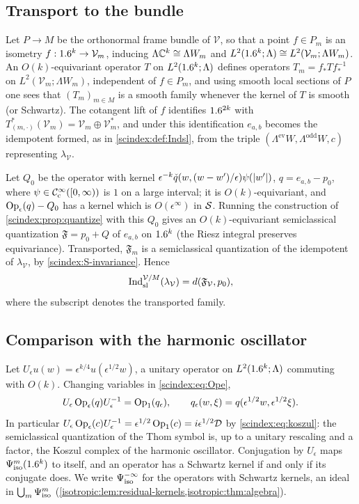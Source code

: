 \subsection{Transport to the bundle}
Let $P\to M$ be the orthonormal frame bundle of $\mathcal V$, so that a point
$f\in P_m$ is an isometry $f:1.6^k\to\mathcal V_m$, inducing $\Lambda\mathbb{C}^k\cong
\Lambda W_m$ and $L^2(1.6^k;\Lambda)\cong L^2(\mathcal V_m;\Lambda W_m)$. An
$O(k)$-equivariant operator $T$ on $L^2(1.6^k;\Lambda)$ defines operators
$T_m=f_*Tf_*^{-1}$ on $L^2(\mathcal V_m;\Lambda W_m)$, independent of $f\in P_m$, and
using smooth local sections of $P$ one sees that $(T_m)_{m\in M}$ is a smooth
family whenever the kernel of $T$ is smooth (or Schwartz). The cotangent lift of $f$
identifies $1.6^{2k}$ with $T^*_{(m,\cdot)}(\mathcal V_m)=\mathcal V_m\oplus
\mathcal V_m^*$, and under this identification $e_{a,b}$ becomes the idempotent
formed, as in \cref{scindex:def:Indsl}, from the triple $(\Lambda^{\mathrm{ev}}W,
\Lambda^{\mathrm{odd}}W,c)$ representing $\lambda_{\mathcal V}$.

Let $Q_0$ be the operator with kernel $\epsilon^{-k}\check q(w,(w-w')/\epsilon)
\psi(\lvert w'\rvert)$, $q=e_{a,b}-p_0$, where $\psi\in\mathcal{C}^\infty_{\mathrm{c}}([0,\infty))$ is $1$ on a
large interval; it is $O(k)$-equivariant, and $\operatorname{Op}_\epsilon(q)-Q_0$ has a kernel which is
$O(\epsilon^\infty)$ in $\mathcal{S}$. Running the construction of
\cref{scindex:prop:quantize} with this $Q_0$ gives an $O(k)$-equivariant
semiclassical quantization $\mathfrak F=p_0+Q$ of $e_{a,b}$ on $1.6^k$ (the Riesz
integral preserves equivariance). Transported, $\mathfrak F_m$ is a semiclassical
quantization of the idempotent of $\lambda_{\mathcal V}$, by
\ref{scindex:S-invariance}. Hence
\begin{equation}\label{scindex:eq:thom-F}
  \operatorname{Ind}^{\mathcal V/M}_{\mathrm{sl}}(\lambda_{\mathcal V})=d(\mathfrak F_{\mathcal V},p_0),
\end{equation}
where the subscript denotes the transported family.

\subsection{Comparison with the harmonic oscillator}
Let $U_\epsilon u(w)=\epsilon^{k/4}u(\epsilon^{1/2}w)$, a unitary operator on
$L^2(1.6^k;\Lambda)$ commuting with $O(k)$. Changing variables in
\eqref{scindex:eq:Ope},
\begin{equation}\label{scindex:eq:dilation}
  U_\epsilon\operatorname{Op}_\epsilon(q)U_\epsilon^{-1}=\operatorname{Op}_1(q_\epsilon),\qquad
  q_\epsilon(w,\xi)=q(\epsilon^{1/2}w,\epsilon^{1/2}\xi).
\end{equation}
In particular $U_\epsilon\operatorname{Op}_\epsilon(c)U_\epsilon^{-1}=\epsilon^{1/2}\operatorname{Op}_1(c)
=i\epsilon^{1/2}\mathcal D$ by \eqref{scindex:eq:koszul}: the semiclassical
quantization of the Thom symbol is, up to a unitary rescaling and a factor, the
Koszul complex of the harmonic oscillator. Conjugation by $U_\epsilon$ maps
$\Psi^{m}_{\mathrm{iso}}(1.6^k)$ to itself, and an operator has a Schwartz kernel if and only if
its conjugate does. We write $\Psi^{-\infty}_{\mathrm{iso}}$ for the operators with Schwartz
kernels, an ideal in $\bigcup_m\Psi^{m}_{\mathrm{iso}}$ (\cref{isotropic:lem:residual-kernels,isotropic:thm:algebra}).

